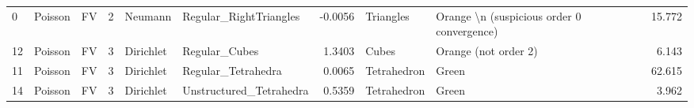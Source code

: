 \begin{tabular}{lllrllrllr}
0  &   Poisson &         FV &         2 &    Neumann &   Regular\_RightTriangles &       -0.0056 &      Triangles &  Orange \textbackslash n (suspicious order 0 convergence) &       15.772 \\
12 &   Poisson &         FV &         3 &  Dirichlet &            Regular\_Cubes &        1.3403 &          Cubes &                        Orange (not order 2) &        6.143 \\
11 &   Poisson &         FV &         3 &  Dirichlet &       Regular\_Tetrahedra &        0.0065 &    Tetrahedron &                                       Green &       62.615 \\
14 &   Poisson &         FV &         3 &  Dirichlet &  Unstructured\_Tetrahedra &        0.5359 &    Tetrahedron &                                       Green &        3.962 \\
\bottomrule
\end{tabular}
